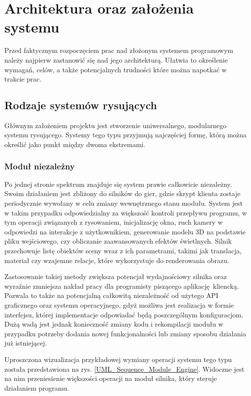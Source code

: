 \chapter{Architektura oraz założenia systemu}
Przed faktycznym rozpoczęciem prac nad złożonym systemem programowym należy najpierw zastanowić się nad jego architekturą.
Ułatwia to określenie wymagań, celów, a także potencjalnych trudności które można napotkać w trakcie prac. 

\section{Rodzaje systemów rysujących}
Głównym założeniem projektu jest stworzenie uniwersalnego, modularnego systemu rysującego.
Systemy tego typu przyjmują najczęściej formę, którą można określić jako punkt między dwoma ekstremami. 

\subsection{Moduł niezależny}
\label{Subsection_module_types_engine}
Po jednej stronie spektrum znajduje się system prawie całkowicie niezależny. Swoim działaniem jest zbliżony do silników do gier, gdzie skrypt klienta zostaje periodycznie wywołany w celu zmiany wewnętrznego stanu modułu. System jest w takim przypadku odpowiedzialny za większość kontroli przepływu programu, w tym operacji związanych z rysowaniem, inicjalizację okna, ruch kamery w odpowiedzi na interakcje z użytkownikiem, generowanie modelu 3D na podstawie pliku wejściowego, czy obliczanie zaawansowanych efektów świetlnych. Silnik przechowuje listę obiektów sceny wraz z ich parametrami, takimi jak translacja, materiał czy wzajemne relacje, które wykorzystuje do renderowania obrazu. 

Zastosowanie takiej metody zwiększa potencjał wydajnościowy silnika oraz wyraźnie zmniejsza nakład pracy dla programisty piszącego aplikację kliencką. Pozwala to także na potencjalną całkowitą niezależność od użytego API graficznego oraz systemu operacyjnego, gdyż możliwa jest realizacja w formie interfejsu, której implementacje odpowiadać będą poszczególnym konfiguracjom. Dużą wadą jest jednak konieczność zmiany kodu i rekompilacji modułu w przypadku potrzeby dodania nowej funkcjonalności lub zmiany sposobu działania już istniejącej. 

Uproszczona wizualizacja przykładowej wymiany operacji systemu tego typu została przedstawiona na rys. \ref{UML_Sequence_Module_Engine}. Widoczne jest na nim przeniesienie większości operacji na moduł silnika, który steruje działaniem programu.

